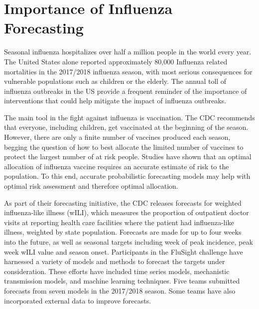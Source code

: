\documentclass{umassthesis}          %
\begin{document}
\section{Importance of Influenza Forecasting}


Seasonal influenza hospitalizes over half a million people in the world every year\cite{lafond2016global}.
The United States alone reported approximately 80,000 Influenza related mortalities in the 2017/2018 influenza season, with most serious consequences for vulnerable populations such as children or the elderly. The annual toll of influenza outbreaks in the US provide a frequent reminder of the importance of interventions that could help mitigate the impact of influenza outbreaks.\cite{skowronski2018early}


The main tool in the fight against influenza is vaccination. The CDC recommends that everyone, including children, get vaccinated at the beginning of the season. However, there are only a finite number of vaccines produced each season, begging the question of how to best allocate the limited number of vaccines to protect the largest number of at risk people. Studies have shown that an optimal allocation of influenza vaccine requires an accurate estimate of risk to the population. \cite{mylius2008optimal} To this end, accurate probabilistic forecasting models may help with optimal risk assessment and therefore optimal allocation. 


As part of their forecasting initiative, the CDC releases forecasts for weighted influenza-like illness (wILI), which measures the proportion of outpatient doctor visits at reporting health care facilities where the patient had influenza-like illness, weighted by state population. Forecasts are made for up to four weeks into the future, as well as seasonal targets including week of peak incidence, peak week wILI value and season onset. Participants in the FluSight challenge have harnessed a variety of models and methods to forecast the targets under consideration. These efforts have included time series models, mechanistic transmission models, and machine learning techniques.\cite{kandula2018evaluation} Five teams submitted forecasts from seven models in the 2017/2018 season.\cite{biggerstaff2018results} Some teams have also incorporated external data to improve forecasts.\cite{dugas2013Influenza}\cite{araz2014using}\cite{volkova2017forecasting}
\end{document}
